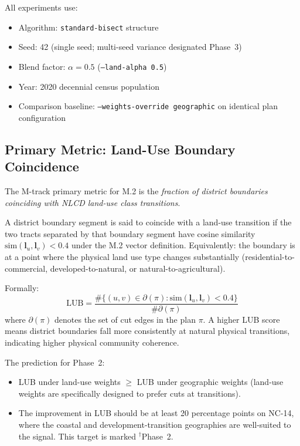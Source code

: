 All experiments use:
\begin{itemize}
  \item Algorithm: \texttt{standard-bisect} structure
  \item Seed: 42 (single seed; multi-seed variance designated Phase~3)
  \item Blend factor: $\alpha = 0.5$ (\texttt{--land-alpha 0.5})
  \item Year: 2020 decennial census population
  \item Comparison baseline: \texttt{--weights-override geographic}
    on identical plan configuration
\end{itemize}

\subsection{Primary Metric: Land-Use Boundary Coincidence}

The M-track primary metric for M.2 is the \emph{fraction of district
boundaries coinciding with NLCD land-use class transitions}.

A district boundary segment is said to coincide with a land-use transition
if the two tracts separated by that boundary segment have cosine similarity
$\mathrm{sim}(\mathbf{l}_u, \mathbf{l}_v) < 0.4$ under the M.2 vector definition.
Equivalently: the boundary is at a point where the physical land use type
changes substantially (residential-to-commercial, developed-to-natural,
or natural-to-agricultural).

Formally:
\begin{equation}
  \mathrm{LUB} = \frac{\#\{(u,v) \in \partial(\pi) :
    \mathrm{sim}(\mathbf{l}_u, \mathbf{l}_v) < 0.4\}}
  {\#\partial(\pi)}
  \label{eq:lub}
\end{equation}
where $\partial(\pi)$ denotes the set of cut edges in the plan $\pi$.
A higher LUB score means district boundaries fall more consistently at
natural physical transitions, indicating higher physical community coherence.

The prediction for Phase~2:
\begin{itemize}
  \item LUB under land-use weights $\geq$ LUB under geographic weights
    (land-use weights are specifically designed to prefer cuts at transitions).
  \item The improvement in LUB should be at least 20 percentage points on
    NC-14, where the coastal and development-transition geographies are
    well-suited to the signal.
    This target is marked ${}^{\dagger}$Phase~2.
\end{itemize}

